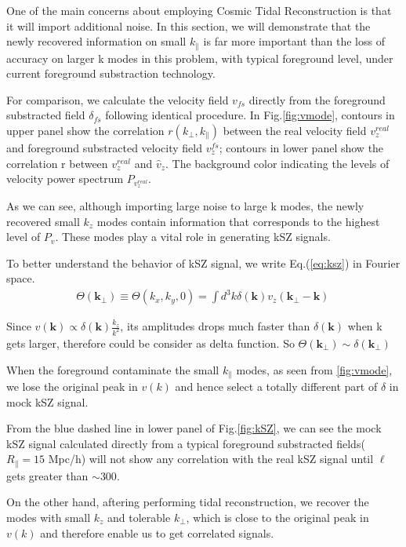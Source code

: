 One of the main concerns about employing Cosmic Tidal Reconstruction is that it will import additional noise.
In this section, we will demonstrate that 
the newly recovered information on small $k_\parallel$ is far
more important than the loss of accuracy on larger k modes in this
problem, with typical foreground level, under current foreground substraction technology.

For comparison, we calculate the velocity field $v_{fs}$
directly from the foreground substracted field $\delta_{fs}$ following identical procedure.
In Fig.\ref{fig:vmode}, contours in upper panel show the 
correlation $r(k_\perp,k_\parallel)$ between the real velocity field
$v_z^{real}$ and foreground substracted velocity field $v_z^{fs}$; 
contours in lower panel show the
correlation r between $v_z^{real}$ and $\hat v_z$. 
The background color indicating the levels of velocity power spectrum
$P_{v_z^{real}}$. 

As we can see, although importing large noise to large k modes, 
the newly recovered small $k_z$ modes contain information that
corresponds to the highest level of $P_{v}$. 
These modes play a vital role in generating kSZ signals.

To better understand the behavior of kSZ signal, we write Eq.(\ref{eq:ksz}) in Fourier space.\begin{eqnarray}
\Theta(\bm{k_\perp})\equiv \Theta(k_x,k_y,0)=\int d^3k \delta(\bm{k}) v_z(\bm{k_\perp}-\bm{k})\,
\end{eqnarray}

Since $v(\bm{k})\propto \delta(\bm{k})\frac{k_z}{k^2}$, 
its amplitudes drops much faster than $\delta(\bm{k})$ when k gets larger, 
therefore could be consider as delta function. So $\Theta(\bm{k_\perp})\sim\delta(\bm{k_\perp})$

When the foreground contaminate the small $k_\parallel$ modes, as seen
from \ref{fig:vmode}, we lose the original peak in $v(k)$ and hence
select a totally different part of $\delta$ in mock kSZ signal.

From the blue dashed line in lower panel of Fig.\ref{fig:kSZ}, we can see the mock kSZ
signal calculated directly from a typical foreground substracted
fields($R_\parallel=15$ Mpc/h) will not
show any correlation with the real kSZ signal until $\ell$ gets greater
than $\sim300$.

On the other hand, aftering performing tidal reconstruction, we
recover the modes with small $k_z$ and tolerable $k_\perp$, 
which is close to the original peak in $v(k)$ and therefore enable us to get correlated signals.


